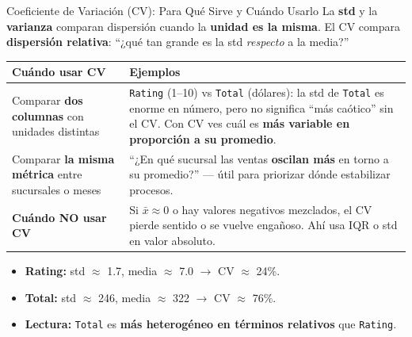 \documentclass[aspectratio=169, 11pt]{beamer}
\begin{document}
\begin{frame}[shrink=8]{Coeficiente de Variación (CV): Para Qué Sirve y Cuándo Usarlo}
  \vspace{-4pt}
  {\footnotesize
    La \textbf{std} y la \textbf{varianza} comparan dispersión cuando la \textbf{unidad es la misma}.
    El CV compara \textbf{dispersión relativa}: ``¿qué tan grande es la std \textit{respecto} a la media?''}

  \vspace{4pt}
  \begin{center}
  \end{center}

  \vspace{4pt}
  {\scriptsize
  \begin{tabular}{@{}p{3.2cm}p{9.5cm}@{}}
    \toprule
    \textbf{Cuándo usar CV} & \textbf{Ejemplos} \\
    \midrule
    Comparar \textbf{dos columnas} con unidades distintas &
      \texttt{Rating} (1--10) vs \texttt{Total} (dólares): la std de \texttt{Total} es enorme en número, pero no significa ``más caótico'' sin el CV. Con CV ves cuál es \textbf{más variable en proporción a su promedio}. \\
    Comparar \textbf{la misma métrica} entre sucursales o meses &
      ``¿En qué sucursal las ventas \textbf{oscilan más} en torno a su promedio?'' --- útil para priorizar dónde estabilizar procesos. \\
    \midrule
    \textbf{Cuándo NO usar CV} & Si $\bar{x} \approx 0$ o hay valores negativos mezclados, el CV pierde sentido o se vuelve engañoso. Ahí usa IQR o std en valor absoluto. \\
    \bottomrule
  \end{tabular}
  }

  \vspace{4pt}
  {\footnotesize
  \begin{itemize}\setlength{\itemsep}{3pt}
    \item[{\color{codeBlue}\scriptsize\faArrowRight}]
      \textbf{Rating:} std $\approx$ 1.7, media $\approx$ 7.0 $\to$ CV $\approx$ 24\%.
    \item[{\color{codeOrange}\scriptsize\faArrowRight}]
      \textbf{Total:} std $\approx$ 246, media $\approx$ 322 $\to$ CV $\approx$ 76\%.
    \item[{\color{arcaRed}\scriptsize\faArrowRight}]
      \textbf{Lectura:} \texttt{Total} es \textbf{más heterogéneo en términos relativos} que \texttt{Rating}.
  \end{itemize}
  }


\end{frame}
\end{document}
